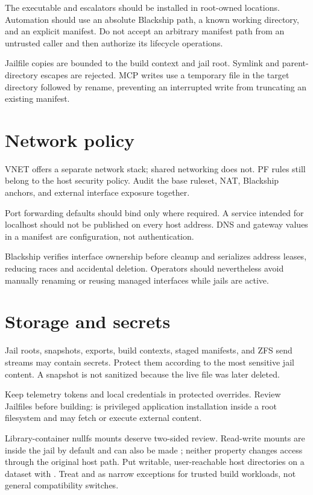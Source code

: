 The executable and escalators should be installed in root-owned locations.
Automation should use an absolute Blackship path, a known working directory,
and an explicit manifest. Do not accept an arbitrary manifest path from an
untrusted caller and then authorize its lifecycle operations.

Jailfile copies are bounded to the build context and jail root. Symlink and
parent-directory escapes are rejected. MCP writes use a temporary file in the
target directory followed by rename, preventing an interrupted write from
truncating an existing manifest.

\section{Network policy}

VNET offers a separate network stack; shared networking does not. PF rules
still belong to the host security policy. Audit the base ruleset, NAT, Blackship
anchors, and external interface exposure together.

Port forwarding defaults should bind only where required. A service intended
for localhost should not be published on every host address. DNS and gateway
values in a manifest are configuration, not authentication.

Blackship verifies interface ownership before cleanup and serializes address
leases, reducing races and accidental deletion. Operators should nevertheless
avoid manually renaming or reusing managed interfaces while jails are active.

\section{Storage and secrets}

Jail roots, snapshots, exports, build contexts, staged manifests, and ZFS send
streams may contain secrets. Protect them according to the most sensitive jail
content. A snapshot is not sanitized because the live file was later deleted.

Keep telemetry tokens and local credentials in protected overrides. Review
Jailfiles before building:  is privileged application installation
inside a root filesystem and may fetch or execute external content.

Library-container nullfs mounts deserve two-sided review. Read-write mounts are
 inside the jail by default and can also be made
; neither property changes access through the original host
path. Put writable, user-reachable host directories on a dataset with
. Treat  and
 as narrow exceptions for trusted build workloads,
not general compatibility switches.

